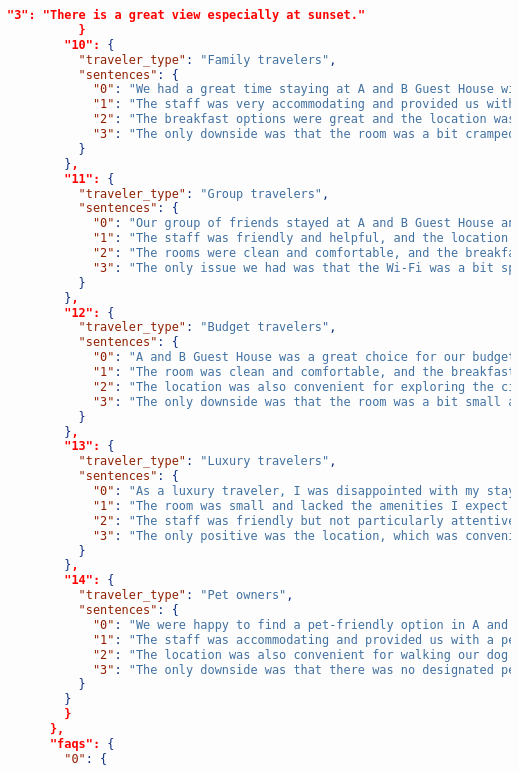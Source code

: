 \begin{lstlisting}[language=json,basicstyle=\scriptsize,columns=flexible]
            "3": "There is a great view especially at sunset."
          }
        "10": {
          "traveler_type": "Family travelers",
          "sentences": {
            "0": "We had a great time staying at A and B Guest House with our kids.",
            "1": "The staff was very accommodating and provided us with a baby crib and high chair upon request.",
            "2": "The breakfast options were great and the location was convenient for our family activities.",
            "3": "The only downside was that the room was a bit cramped for our family of four."
          }
        },
        "11": {
          "traveler_type": "Group travelers",
          "sentences": {
            "0": "Our group of friends stayed at A and B Guest House and we had a great time.",
            "1": "The staff was friendly and helpful, and the location was perfect for exploring the city.",
            "2": "The rooms were clean and comfortable, and the breakfast was delicious.",
            "3": "The only issue we had was that the Wi-Fi was a bit spotty in some areas of the guest house."
          }
        },
        "12": {
          "traveler_type": "Budget travelers",
          "sentences": {
            "0": "A and B Guest House was a great choice for our budget-friendly trip.",
            "1": "The room was clean and comfortable, and the breakfast options were good.",
            "2": "The location was also convenient for exploring the city on foot.",
            "3": "The only downside was that the room was a bit small and there was no elevator."
          }
        },
        "13": {
          "traveler_type": "Luxury travelers",
          "sentences": {
            "0": "As a luxury traveler, I was disappointed with my stay at A and B Guest House.",
            "1": "The room was small and lacked the amenities I expect from a luxury hotel.",
            "2": "The staff was friendly but not particularly attentive to my needs.",
            "3": "The only positive was the location, which was convenient for exploring the city."
          }
        },
        "14": {
          "traveler_type": "Pet owners",
          "sentences": {
            "0": "We were happy to find a pet-friendly option in A and B Guest House.",
            "1": "The staff was accommodating and provided us with a pet bed and bowls upon request.",
            "2": "The location was also convenient for walking our dog.",
            "3": "The only downside was that there was no designated pet area for our dog to use the bathroom."
          }
        }
        }
      },
      "faqs": {
        "0": {

\end{lstlisting}
